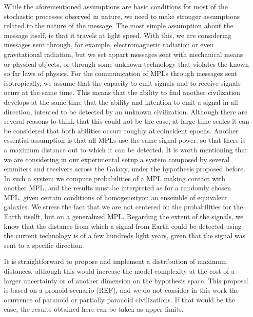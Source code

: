 While the aforementioned assumptions are basic conditions for most of
the stochastic processes observed in nature, we need to make stronger
assumptions related to the nature of the message.
%
The most simple assumption about the message itself, is that it
travels at light speed.
%
With this, we are considering messages sent through, for example,
electromagnetic radiation or even gravitational radiation, but we set
appart messages sent with mechanical means or physical objects, or
through some unknown technology that violates the known so far laws of
physics.
% 
For the communication of MPLs through messages sent isotropically, we
assume that the capacity to emit signals and to receive signals ocurr
at the same time.
%
This means that the ability to find another civilization develops at
the same time that the ability and intention to emit a signal in all
direction, intented to be detected by an unknown civilization.
%
Although there are several reasons to think that this could not be the
case, at large time scales it can be considered that both abilities
occurr roughly at coincident epochs.
%
Another essential assumption is that all MPLs use the same signal
power, so that there is a maximum distance out to which it can be
detected.
%
It is worth mentioning that we are considering in our experimental
setup a system composed by several emmiters and receivers across the
Galaxy, under the hypothesis proposed before.
%
In such a system we compute probabilities of a MPL making contact
with another MPL, and the results must be interpreted as for a
randomly chosen MPL, given certain conditions of homogeneityon an
ensemble of equivalent galaxies.
%
We stress the fact that we are not centered on the probabilities for
the Earth itselft, but on a generalized MPL.
%
Regarding the extent of the signals, we know that the distance from
which a signal from Earth could be detected using the current
technology is of a few hundreds light years, given that the signal was
sent to a specific direction.

               

%
It is straightforward to propose and implement a distribution of
maximum distances, although this would increase the model complexity
at the cost of a larger uncertainty or of another dimension on the
hypothesis space.
%
This proposal is based on a pronoid scenario (REF), and we do not
consider in this work the ocurrence of paranoid or partially paranoid
civilizations.
%
If that would be the case, the results obtained here can be taken as
upper limits.



